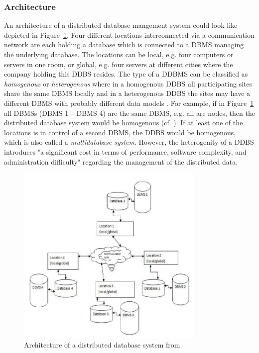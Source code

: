 \subsubsection{Architecture}
\label{sec:theo_ddb_arch}
An architecture of a distributed database mangement system could look like depicted in Figure~\ref{fig:ddbs_arch}. Four different locations interconnected
via a communication network are each holding a database which is connected to a DBMS managing the underlying database. The locations can be local, e.g.
four computers or servers in one room, or global, e.g. four servers at different cities where the company holding this DDBS resides. The type of a DDBMS
can be classified as \emph{homogenous} or \emph{heterogenous} where in a homogenous DDBS all participating sites share the same DBMS locally and in a
heterogenous DDBS the sites may have a different DBMS with probably different data models \cite[p.~607]{Ramakrish2000}. For example, if in
Figure~\ref{fig:ddbs_arch} all DBMSs (DBMS 1 -- DBMS 4) are the same DBMS, e.g. all are  nodes, then the distributed database system
would be homogenous (cf. \cite[Fig.~2]{Jadhav2017}). If at least one of the locations is in control of a second DBMS, the DDBS would be homogenous, which
is also called a \emph{multidatabase system}. However, the heterogenity of a DDBS introduces "a significant cost in terms of performance, software
complexity, and administration difficulty" \cite[p.~608, l.13--14]{Ramakrish2000} regarding the management of the distributed data.

\begin{figure}[h]
    \centering
    \includegraphics[width=0.8\textwidth,keepaspectratio=true]{img/DDBMS_Architecture.pdf}
    \caption{Architecture of a distributed database system from \cite[Fig.~1]{Kumar2013}}
    \label{fig:ddbs_arch}
\end{figure}

